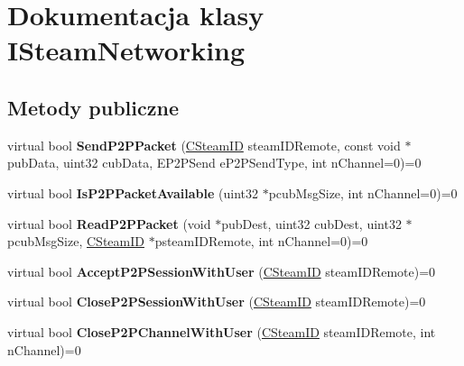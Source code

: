 \hypertarget{class_i_steam_networking}{}\section{Dokumentacja klasy I\+Steam\+Networking}
\label{class_i_steam_networking}
\subsection*{Metody publiczne}
\begin{DoxyCompactItemize}
\item 
\mbox{\label{class_i_steam_networking_a133b68cf61ed66ad1ab615413bd69d7a}} 
virtual bool {\bfseries Send\+P2\+P\+Packet} (\hyperlink{class_c_steam_i_d}{C\+Steam\+ID} steam\+I\+D\+Remote, const void $\ast$pub\+Data, uint32 cub\+Data, E\+P2\+P\+Send e\+P2\+P\+Send\+Type, int n\+Channel=0)=0
\item 
\mbox{\label{class_i_steam_networking_a414d0488d95bd4540c2752d45c05a14e}} 
virtual bool {\bfseries Is\+P2\+P\+Packet\+Available} (uint32 $\ast$pcub\+Msg\+Size, int n\+Channel=0)=0
\item 
\mbox{\label{class_i_steam_networking_a171241063c2e7f0d0aad97ba286f52c4}} 
virtual bool {\bfseries Read\+P2\+P\+Packet} (void $\ast$pub\+Dest, uint32 cub\+Dest, uint32 $\ast$pcub\+Msg\+Size, \hyperlink{class_c_steam_i_d}{C\+Steam\+ID} $\ast$psteam\+I\+D\+Remote, int n\+Channel=0)=0
\item 
\mbox{\label{class_i_steam_networking_a9d25d344ffcb1c53e367ff810f36b79c}} 
virtual bool {\bfseries Accept\+P2\+P\+Session\+With\+User} (\hyperlink{class_c_steam_i_d}{C\+Steam\+ID} steam\+I\+D\+Remote)=0
\item 
\mbox{\label{class_i_steam_networking_a7d6845b453e676fc9e476c1d94b3d725}} 
virtual bool {\bfseries Close\+P2\+P\+Session\+With\+User} (\hyperlink{class_c_steam_i_d}{C\+Steam\+ID} steam\+I\+D\+Remote)=0
\item 
\mbox{\label{class_i_steam_networking_a5e17571ca6b0a4d99c93d0f55293acb5}} 
virtual bool {\bfseries Close\+P2\+P\+Channel\+With\+User} (\hyperlink{class_c_steam_i_d}{C\+Steam\+ID} steam\+I\+D\+Remote, int n\+Channel)=0

\end{DoxyCompactItemize}
